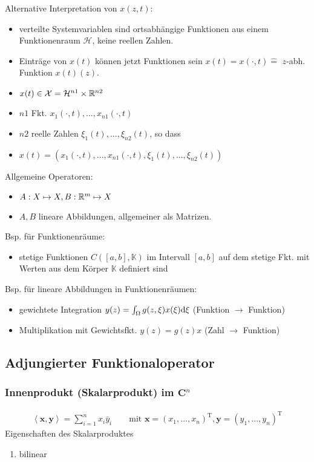 Alternative Interpretation von $x(z,t)$:
\begin{itemize}
\item verteilte Systemvariablen sind ortsabhängige Funktionen aus einem Funktionenraum $\mathcal{H}$, keine reellen Zahlen.


\item  Einträge von $x(t)$ können jetzt Funktionen sein
\subitem $x(t) = x(\cdot,t) \hat{=}$ $z$-abh. Funktion $x(t)(z)$.

\item $x(t) \in \mathcal{X} = \mathcal{H}^{n1} \times \mathbb{R}^{n2}$ 

\item $n1$ Fkt. $x_1(\cdot,t),...,x_{n1}(\cdot,t)$
\item $n2$ reelle Zahlen $\xi_1(t),...,\xi_{n2}(t)$, so dass

\item $x(t) = (x_1(\cdot,t),...,x_{n1}(\cdot,t),\xi_1(t),...,\xi_{n2}(t))$
\end{itemize}
Allgemeine Operatoren:
\begin{itemize}
\item $A:X\mapsto X, B:\mathbb{R}^m \mapsto X$
\item $A,B$ lineare Abbildungen, allgemeiner als Matrizen. 
\end{itemize}
Bsp. für Funktionenräume:
\begin{itemize}
\item stetige Funktionen $C([a,b],\mathbb{K})$ im Intervall $[a,b]$ auf dem stetige Fkt. mit Werten aus dem Körper $\mathbb{K}$ definiert sind
\end{itemize}
Bsp. für lineare Abbildungen in Funktionenräumen:
\begin{itemize}
\item gewichtete Integration $y(z) = \int_\Omega g(z,\xi)x(\xi) \mathrm{d} \xi$  (Funktion $\rightarrow$ Funktion)
\item Multiplikation mit Gewichtsfkt. $y(z)=g(z)x$ (Zahl $\rightarrow$ Funktion)
\end{itemize}
\subsection{Adjungierter Funktionaloperator}
\subsubsection{Innenprodukt (Skalarprodukt) im $\mathbf{C}^n$}
\begin{align*}
\left\langle \bm{x},\bm{y} \right\rangle = \sum_{i=1}^{n}x_i\bar{y}_i \qquad \textrm{mit }\bm{x}=(x_1,...,x_n)^\textrm{T},\bm{y}=(y_1,...,y_n)^\textrm{T}
\end{align*}
Eigenschaften des Skalarproduktes
\begin{enumerate}
\item bilinear
\end{enumerate}
